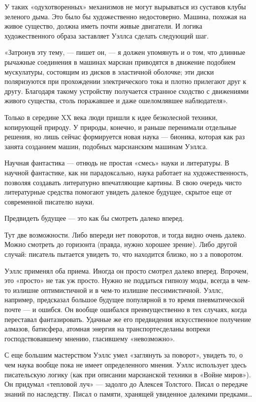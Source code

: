 У таких «одухотворенных» механизмов не могут вырываться из суставов  клубы
зеленого дыма. Это было бы художественно недостоверно. Машина, похожая  на
живое  существо,   должна   иметь   почти  живые   двигатели.   И   логика
художественного образа заставляет Уэллса сделать следующий шаг.

«Затронув эту тему, — пишет он, — я должен упомянуть и о том, что  длинные
рычажные соединения  в  машинах  марсиан приводятся  в  движение  подобием
мускулатуры,  состоящим  из  дисков  в  эластичной  оболочке;  эти   диски
поляризуются при прохождении электрического тока и плотно прилегают друг к
другу.  Благодаря  такому  устройству   получается  странное  сходство   с
движениями  живого  существа,   столь  поражавшее   и  даже   ошеломлявшее
наблюдателя».

Только в  середине  XX  века  люди  пришли  к  идее  безколесной  техники,
копирующей природу.  У природы,  конечно,  и раньше  перенимали  отдельные
решения, но лишь сейчас формируется новая наука — бионика, которая как раз
занята созданием машин, подобных марсианским машинам Уэллса.

Научная фантастика  — отнюдь  не  простая «смесь»  науки и  литературы.  В
научной   фантастике,   как   ни   парадоксально,   наука   работает    на
художественность, позволяя создавать  литературно впечатляющие картины.  В
свою очередь чисто литературные средства помогают увидеть далекое будущее,
скрытое еще от современной писателю науки.

Предвидеть будущее — это как бы смотреть далеко вперед.

Тут две  возможности. Либо  впереди  нет поворотов,  и тогда  видно  очень
далеко. Можно смотреть до горизонта  (правда, нужно хорошее зрение).  Либо
другой случай: писатель пытается увидеть то, что находится близко, но з  а
поворотом.

Уэллс применял  оба  приема.  Иногда  он  просто  смотрел  далеко  вперед.
Впрочем, это «просто» не так уж  просто. Нужно не поддаться гипнозу  моды,
всегда в чем-то излишне оптимистичной  и в чем-то излишне  пессимистичной.
Уэллс,  например,  предсказал  большое  будущее  популярной  в  то   время
пневматической почте — и ошибся. Он вообще ошибался преимущественно в  тех
случаях,  когда  переставал  фантазировать.  Удачные  же  его  предвидения
искусственное   получение   алмазов,   батисфера,   атомная   энергия   на
транспортесделаны    вопреки    господствовавшему    мнению,    гласившему
«невозможно».

С еще большим мастерством Уэллс умел «заглянуть за поворот», увидеть то, о
чем наука  вообще пока  не имеет  определенного мнения.  Уэллс  использует
здесь писательскую логику (как при  описании марсианской техники в  «Войне
миров»). Он придумал «тепловой луч» — задолго до Алексея Толстого. Писал о
передаче знаний по наследству. Писал о памяти, хранящей увиденное далекими
предками…

